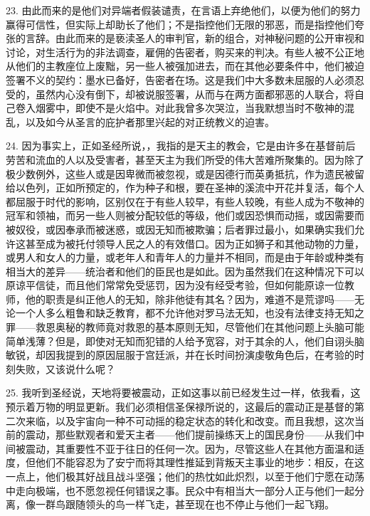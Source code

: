 23. 由此而来的是他们对异端者假装谴责，在言语上弃绝他们，以便为他们的努力赢得可信性，但实际上却助长了他们；不是指控他们无限的邪恶，而是指控他们夸张的言辞。由此而来的是亵渎圣人的审判官，新的组合，对神秘问题的公开审视和讨论，对生活行为的非法调查，雇佣的告密者，购买来的判决。有些人被不公正地从他们的主教座位上废黜，另一些人被强加进去，而在其他必要条件中，他们被迫签署不义的契约：墨水已备好，告密者在场。这是我们中大多数未屈服的人必须忍受的，虽然内心没有倒下，却被说服签署，从而与在两方面都邪恶的人联合，将自己卷入烟雾中，即使不是火焰中。对此我曾多次哭泣，当我默想当时不敬神的混乱，以及如今从圣言的庇护者那里兴起的对正统教义的迫害。\par

24. 因为事实上，正如圣经所说，，我指的是天主的教会，它是由许多在基督前后劳苦和流血的人以及受害者，甚至天主为我们所受的伟大苦难所聚集的。因为除了极少数例外，这些人或是因卑微而被忽视，或是因德行而英勇抵抗，作为遗民被留给以色列，正如所预定的，作为种子和根，要在圣神的溪流中开花并复活，每个人都屈服于时代的影响，区别仅在于有些人较早，有些人较晚，有些人成为不敬神的冠军和领袖，而另一些人则被分配较低的等级，他们或因恐惧而动摇，或因需要而被奴役，或因奉承而被迷惑，或因无知而被欺骗；后者罪过最小，如果确实我们允许这甚至成为被托付领导人民之人的有效借口。因为正如狮子和其他动物的力量，或男人和女人的力量，或老年人和青年人的力量并不相同，而是由于年龄或种类有相当大的差异——统治者和他们的臣民也是如此。因为虽然我们在这种情况下可以原谅平信徒，而且他们常常免受惩罚，因为没有经受考验，但如何能原谅一位教师，他的职责是纠正他人的无知，除非他徒有其名？因为，难道不是荒谬吗——无论一个人多么粗鲁和缺乏教育，都不允许他对罗马法无知，也没有法律支持无知之罪——救恩奥秘的教师竟对救恩的基本原则无知，尽管他们在其他问题上头脑可能简单浅薄？但是，即使对无知而犯错的人给予宽容，对于其余的人，他们自诩头脑敏锐，却因我提到的原因屈服于宫廷派，并在长时间扮演虔敬角色后，在考验的时刻失败，又该说什么呢？\par

25. 我听到圣经说，天地将要被震动，正如这事以前已经发生过一样，依我看，这预示着万物的明显更新。我们必须相信圣保禄所说的，这最后的震动正是基督的第二次来临，以及宇宙向一种不可动摇的稳定状态的转化和改变。而且我想，这次当前的震动，那些默观者和爱天主者——他们提前操练天上的国民身份——从我们中间被震动，其重要性不亚于往日的任何一次。因为，尽管这些人在其他方面温和适度，但他们不能容忍为了安宁而将其理性推延到背叛天主事业的地步：相反，在这一点上，他们极其好战且战斗坚强；他们的热忱如此炽烈，以至于他们宁愿在动荡中走向极端，也不愿忽视任何错误之事。民众中有相当大一部分人正与他们一起分离，像一群鸟跟随领头的鸟一样飞走，甚至现在也不停止与他们一起飞翔。\par


